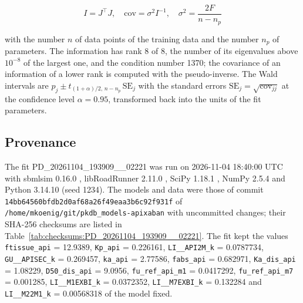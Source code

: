 \begin{equation}
I = J^\top J, \quad \mathrm{cov} = \sigma^2 I^{-1}, \quad \sigma^2 = \frac{2 F}{n - n_p}
\end{equation}

with the number $n$ of data points of the training data and the number $n_p$ of parameters. The information has rank 8 of 8, the number of its eigenvalues above $10^{-8}$ of the largest one, and the condition number 1370; the covariance of an information of a lower rank is computed with the pseudo-inverse. The Wald intervals are $\hat{p}_j \pm t_{(1+\alpha)/2,\, n-n_p}\, \mathrm{SE}_j$ with the standard errors $\mathrm{SE}_j = \sqrt{\mathrm{cov}_{jj}}$ at the confidence level $\alpha = 0.95$, transformed back into the units of the fit parameters.

\subsection{Provenance}

The fit PD\_20261104\_193909\_\_02221 was run on 2026-11-04 18:40:00 UTC with sbmlsim 0.16.0 \cite{Koenig2026_sbmlsim}, libRoadRunner 2.11.0 \cite{Welsh2023}, SciPy 1.18.1 \cite{Virtanen2020}, NumPy 2.5.4 \cite{Harris2020} and Python 3.14.10 (seed 1234). The models and data were those of commit \texttt{14bb64560bfdb2d0af68a26f49eaa3b6c92f931f} of \texttt{/home/mkoenig/git/pkdb\_models-apixaban} with uncommitted changes; their SHA-256 checksums are listed in Table~\ref{tab:checksums:PD_20261104_193909__02221}. The fit kept the values \texttt{ftissue\_api} = 12.9389, \texttt{Kp\_api} = 0.226161, \texttt{LI\_\_API2M\_k} = 0.0787734, \texttt{GU\_\_APISEC\_k} = 0.269457, \texttt{ka\_api} = 2.77586, \texttt{fabs\_api} = 0.682971, \texttt{Ka\_dis\_api} = 1.08229, \texttt{D50\_dis\_api} = 9.0956, \texttt{fu\_ref\_api\_m1} = 0.0417292, \texttt{fu\_ref\_api\_m7} = 0.001285, \texttt{LI\_\_M1EXBI\_k} = 0.0372352, \texttt{LI\_\_M7EXBI\_k} = 0.132284 and \texttt{LI\_\_M22M1\_k} = 0.00568318 of the model fixed.

